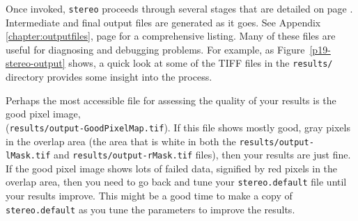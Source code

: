 Once invoked, \texttt{stereo} proceeds through several stages that are
detailed on page \pageref{entrypoints}.  Intermediate and final output
files are generated as it goes.  See Appendix
\ref{chapter:outputfiles}, page \pageref{chapter:outputfiles} for a
comprehensive listing.  Many of these files are useful for diagnosing and
debugging problems.  For example, as Figure~\ref{p19-stereo-output}
shows, a quick look at some of the TIFF files in the \texttt{results/}
directory provides some insight into the process.

Perhaps the most accessible file for assessing the quality of your
results is the good pixel image, \\
(\texttt{results/output-GoodPixelMap.tif}).  If this file shows mostly
good, gray pixels in the overlap area (the area that is white in both
the \texttt{results/output-lMask.tif} and
\texttt{results/output-rMask.tif} files), then your results are just
fine.  If the good pixel image shows lots of failed data, signified by
red pixels in the overlap area, then you need to go back and tune your
\texttt{stereo.default} file until your results improve.  This might be
a good time to make a copy of \texttt{stereo.default} as you tune the
parameters to improve the results.

